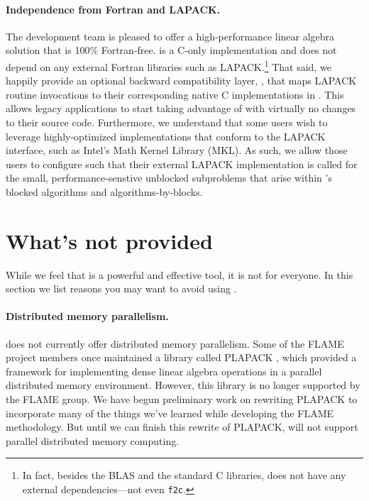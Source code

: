 \paragraph{Independence from Fortran and LAPACK.}
The \libflame development team is pleased to offer a high-performance linear
algebra solution that is 100\% Fortran-free.
\libflame is a C-only implementation and does not depend on any external
Fortran libraries such as LAPACK.\footnote{In fact, besides the BLAS
and the standard C libraries, \libflame does not have any external
dependencies---not even {\tt f2c}.}
That said, we happily provide an optional backward compatibility layer,
\lapacktflamens, that maps LAPACK routine invocations to their
corresponding native C implementations in \libflamens.
This allows legacy applications to start taking advantage of \libflame
with virtually no changes to their source code.
Furthermore, we understand that some users wish to leverage highly-optimized
implementations that conform to the LAPACK interface, such as Intel's Math
Kernel Library (MKL).
As such, we allow those users to configure \libflame such that their external
LAPACK implementation is called for the small, performance-senstive unblocked
subproblems that arise within \libflamens's blocked algorithms and
algorithms-by-blocks.




\section{What's not provided}

While we feel that \libflame is a powerful and effective tool, it is not for
everyone.
In this section we list reasons you may want to avoid using \libflamens.

\paragraph{Distributed memory parallelism.}
\libflame does not currently offer distributed memory parallelism.
Some of the FLAME project members once maintained a library called
PLAPACK \cite{PLAPACK_SC97,PLAPACK}, which provided a framework for
implementing dense linear algebra operations in a parallel distributed
memory environment.  However, this library is no longer supported by
the FLAME group.  We have begun preliminary work on rewriting PLAPACK
to incorporate many of the things we've learned while developing the
FLAME methodology.  But until we can finish this rewrite of PLAPACK,
\libflame will not support parallel distributed memory computing.

